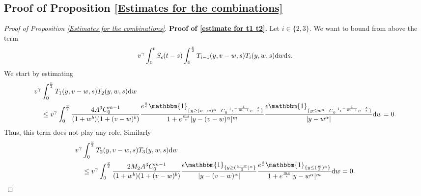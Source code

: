 \documentclass[11pt]{article}
\numberwithin{equation}{section}
\newcommand{\der}{\textup{d}}
\begin{document}
\subsection{Proof of Proposition \ref{Estimates for the combinations}}
\begin{proof}[Proof of Proposition \ref{Estimates for the combinations}]
\textbf{Proof of \eqref{estimate for t1 t2}.} Let $i\in\{2,3\}$. We want to bound from above the term 
\begin{align}\label{semigroup t1 t2}
    v^{\gamma}\int_{0}^{t}S_{\epsilon}(t-s)\int_{0}^{\frac{v}{2}} T_{i-1}(y,v-w,s)T_{i}(y,w,s)\der w\der s.
\end{align}
We start by estimating
\begin{align*}
    v^{\gamma}&\int_{0}^{\frac{v}{2}} T_{1}(y,v-w,s)T_{2}(y,w,s)\der w\\
    &  \leq v^{\gamma}\int_{0}^{\frac{v}{2}} \frac{4 A^{3}C_{0}^{m-1}}{(1+w^{b})(1+(v-w)^{b})}\frac{e^{\frac{s}{\epsilon}}\mathbbm{1}_{\{y\geq (v-w)^{\alpha}-C_{0}^{-1}\epsilon^{-\frac{1}{m-1}}e^{-\frac{s}{\epsilon}}\}}}{1+e^{\frac{ms}{\epsilon}}|y-(v-w)^{\alpha}|^{m}}\frac{\epsilon\mathbbm{1}_{\{y\leq w^{\alpha}-C_{0}^{-1}\epsilon^{-\frac{1}{m-1}}e^{-\frac{s}{\epsilon}}\}}}{|y-w^{\alpha}|}\der w=0.
\end{align*}
Thus, this term does not play any role. Similarly
\begin{align*}
    v^{\gamma}&\int_{0}^{\frac{v}{2}} T_{2}(y,v-w,s)T_{3}(y,w,s)\der w\\
    & \leq  v^{\gamma}\int_{0}^{\frac{v}{2}} \frac{2M_{2}A^{3}C_{0}^{m-1}}{(1+w^{b})(1+(v-w)^{b})}\frac{\epsilon\mathbbm{1}_{\{y\geq (\frac{v-w}{3})^{\alpha}\}}}{|y-(v-w)^{\alpha}|}\frac{e^{\frac{s}{\epsilon}}\mathbbm{1}_{\{y\leq (\frac{w}{3})^{\alpha}\}}}{1+e^{\frac{ms}{\epsilon}}|y-w^{\alpha}|^{m}}\der w=0.
\end{align*}


\end{proof}
\end{document}
